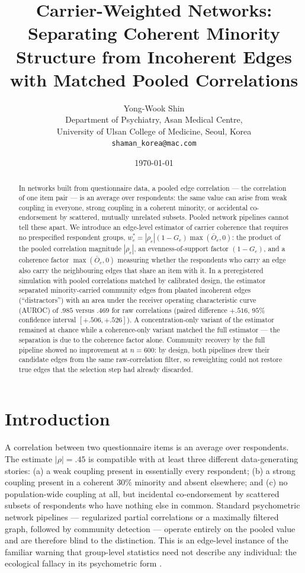 \documentclass[11pt]{article}
\title{Carrier-Weighted Networks: Separating Coherent Minority Structure
from Incoherent Edges with Matched Pooled Correlations}
\author{Yong-Wook Shin\\[2pt]
\normalsize Department of Psychiatry, Asan Medical Centre,\\
\normalsize University of Ulsan College of Medicine, Seoul, Korea\\
\normalsize \texttt{shaman\_korea@mac.com}}
\date{\today}
\newcommand{\Obar}{\bar{O}}
\newcommand{\wstar}{w^{*}}
\begin{document}
\maketitle

\begin{abstract}
In networks built from questionnaire data, a pooled edge correlation ---
the correlation of one item pair --- is an average over respondents: the
same value can arise from weak coupling in everyone, strong coupling in a
coherent minority, or accidental co-endorsement by scattered, mutually
unrelated subsets. Pooled network pipelines cannot tell these apart. We
introduce an edge-level estimator of carrier coherence that requires no
prespecified respondent groups,
$\wstar_e=|\rho_e|(1-G_e)\max(\Obar_e,0)$: the product of the pooled
correlation magnitude $|\rho_e|$, an evenness-of-support factor $(1-G_e)$,
and a coherence factor $\max(\Obar_e,0)$ measuring whether the respondents
who carry an edge also carry the neighbouring edges that share an item with
it. In a preregistered simulation with pooled
correlations matched by calibrated design, the estimator separated
minority-carried community edges from planted incoherent edges
(``distractors'') with an area
under the receiver operating characteristic curve (AUROC) of
$.985$ versus $.469$ for raw correlations (paired difference $+.516$,
$95\%$ confidence interval $[+.506,+.526]$). A concentration-only
variant of the estimator remained at chance while a coherence-only variant
matched the full estimator --- the separation is due to the coherence
factor alone. Community recovery by the full pipeline showed no
improvement at $n=600$: by design, both pipelines drew their candidate
edges from the same raw-correlation filter, so reweighting could not
restore true edges that the selection step had already discarded.
\end{abstract}

\section{Introduction}\label{sec:intro}

A correlation between two questionnaire items is an average over respondents.
The estimate $|\rho|=.45$ is compatible with at least three different
data-generating stories: (a) a weak coupling present in essentially every
respondent; (b) a strong coupling present in a coherent $30\%$ minority and
absent elsewhere; and (c) no population-wide coupling at all, but incidental
co-endorsement by scattered subsets of respondents who have nothing else in
common. Standard psychometric network pipelines --- regularized partial
correlations or a maximally filtered graph, followed by community detection
\citep{epskamp2018,massara2016,pons2006,golino2017} --- operate entirely on
the pooled value and are therefore blind to the distinction. This is an
edge-level instance of the familiar warning that group-level statistics need
not describe any individual: the ecological fallacy in its psychometric form
\citep{molenaar2004,fisher2018}.
\end{document}
